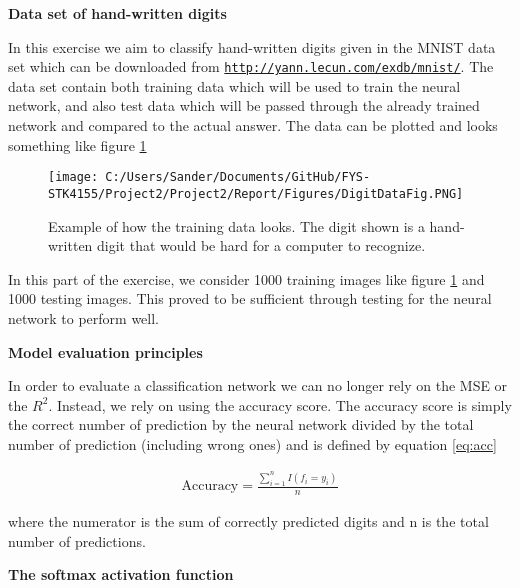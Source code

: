 \documentclass[12pt,a4paper]{article}
\begin{document}
\begin{center}
\large{\textbf{Data set of hand-written digits}}
\end{center}

\noindent In this exercise we aim to classify hand-written digits given in the MNIST data set which can be downloaded from \href{{http://yann.lecun.com/exdb/mnist/}}{\nolinkurl{http://yann.lecun.com/exdb/mnist/}}. The data set contain both training data which will be used to train the neural network, and also test data which will be passed through the already trained network and compared to the actual answer. The data can be plotted and looks something like figure \ref{fig:DigitDataFig}

\begin{figure}[H]
\centering
\texttt{[image: C:/Users/Sander/Documents/GitHub/FYS-STK4155/Project2/Project2/Report/Figures/DigitDataFig.PNG]}
\caption{\label{fig:DigitDataFig} Example of how the training data looks. The digit shown is a hand-written digit that would be hard for a computer to recognize.}
\end{figure}

\noindent In this part of the exercise, we consider 1000 training images like figure \ref{fig:DigitDataFig} and 1000 testing images. This proved to be sufficient through testing for the neural network to perform well.

\begin{center}
\large{\textbf{Model evaluation principles}}
\end{center}

\noindent In order to evaluate a classification network we can no longer rely on the MSE or the $R^2$. Instead, we rely on using the accuracy score. The accuracy score is simply the correct number of prediction by the neural network divided by the total number of prediction (including wrong ones) and is defined by equation \ref{eq:acc}

\begin{equation}\label{eq:acc}
\begin{aligned}
\textrm{Accuracy} = \frac{\sum_{i = 1}^n I(f_i = y_i)}{n}
\end{aligned}
\end{equation}

\noindent where the numerator is the sum of correctly predicted digits and n is the total number of predictions. 

\begin{center}
\large{\textbf{The softmax activation function}}
\end{center}
\end{document}
